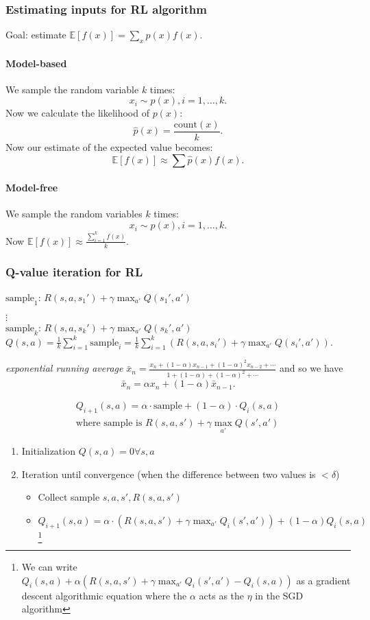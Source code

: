 \documentclass{article}
\begin{document}
\subsubsection{Estimating inputs for RL algorithm}
Goal: estimate $\mathbb{E}[f(x)]=\sum\limits_xp(x)f(x)$.
\paragraph{Model-based}
We sample the random variable $k$ times:
$$x_i\sim p(x),i=1,\ldots,k.$$ Now we calculate the likelihood of $p(x)$:
$$\hat{p}(x)=\frac{\text{count}(x)}{k}.$$
Now our estimate of the expected value becomes:
$$\mathbb{E}[f(x)]\approx\sum\hat{p}(x)f(x).$$

\paragraph{Model-free}
We sample the random variables $k$ times:
$$x_i\sim p(x),i=1,\ldots,k.$$ Now $\mathbb{E}[f(x)]\approx\frac{\sum_{i=1}^kf(x)}{k}$.

\subsubsection{Q-value iteration for RL}
$\text{sample}_1$: $R(s,a,s_1')+\gamma\max_{a'}Q(s_1',a')$

$\vdots$\\
\noindent$\text{sample}_k$: $R(s,a,s_k')+\gamma\max_{a'}Q(s_k',a')$\\
$Q(s,a)=\frac{1}{k}\sum\limits_{i=1}^k\text{sample}_i=\frac{1}{k}\sum\limits_{i=1}^k\left(R(s,a,s_i')+\gamma\max_{a'}Q(s_i',a')\right)$.

\emph{exponential running average}
$\bar{x}_n=\frac{x_n+(1-\alpha)x_{n-1}+(1-\alpha)^2x_{n-2}+\cdots}{1+(1-\alpha)+(1-\alpha)^2+\cdots}$ and so we have $$\bar{x}_n=\alpha x_n+(1-\alpha)\bar{x}_{n-1}.$$


\begin{align*}
	Q_{i+1}(s,a)=\alpha\cdot\text{sample}+(1-\alpha)\cdot Q_i(s,a) \tag{*}\\ \text{where sample is } R(s,a,s')+\gamma\max_{a'}Q(s',a')
\end{align*}

\begin{enumerate}
	\item Initialization $Q(s,a)=0\forall s,a$
	\item Iteration until convergence (when the difference between two values is $<\delta$)
		\begin{itemize}
			\item Collect sample $s,a,s',R(s,a,s')$
			\item $Q_{i+1}(s,a)=\alpha\cdot\left(R(s,a,s')+\gamma\max_{a'}Q_i(s',a')\right)+(1-\alpha)Q_i(s,a)$\footnote{We can write $Q_i(s,a)+\alpha\left(R(s,a,s')+\gamma\max_{a'}Q_i(s',a')-Q_i(s,a)\right)$ as a gradient descent algorithmic equation where the $\alpha$ acts as the $\eta$ in the SGD algorithm}
		\end{itemize}
\end{enumerate}
\end{document}
